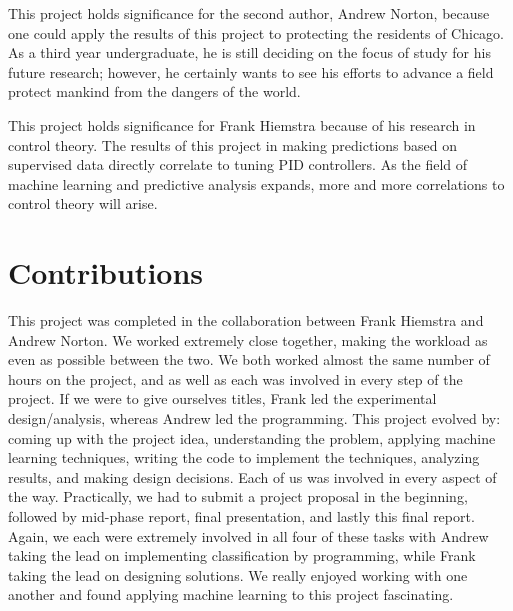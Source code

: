 \documentclass{article} %
\begin{document}
This project holds significance for the second author, Andrew Norton, because one could apply the results of this project to protecting the residents of Chicago. As a third year undergraduate, he is still deciding on the focus of study for his future research; however, he certainly wants to see his efforts to advance a field protect mankind from the dangers of the world.
 
This project holds significance for Frank Hiemstra because of his research in control theory.  The results of this project in making predictions based on supervised data directly correlate to tuning PID controllers.  As the field of machine learning and predictive analysis expands, more and more correlations to control theory will arise.  

\section{Contributions}
This project was completed in the collaboration between Frank Hiemstra and Andrew Norton.  We worked extremely close together, making the workload as even as possible between the two.  We both worked almost the same number of hours on the project, and as well as each was involved in every step of the project.  If we were to give ourselves titles, Frank led the experimental design/analysis, whereas Andrew led the programming.  This project evolved by: coming up with the project idea, understanding the problem, applying machine learning techniques, writing the code to implement the techniques, analyzing results, and making design decisions.  Each of us was involved in every aspect of the way.  Practically, we had to submit a project proposal in the beginning, followed by mid-phase report, final presentation, and lastly this final report.  Again, we each were extremely involved in all four of these tasks with Andrew taking the lead on implementing classification by programming, while Frank taking the lead on designing solutions.  We really enjoyed working with one another and found applying machine learning to this project fascinating. 
\end{document}
